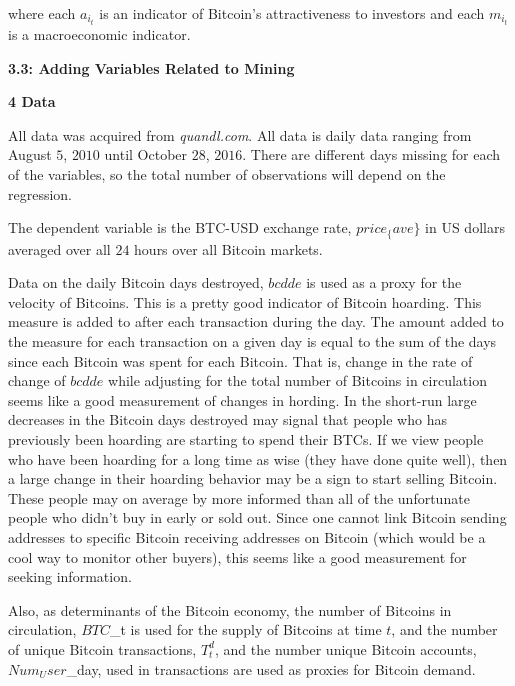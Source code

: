 \documentclass{article}[10 pt]
\newcommand{\vs}{\vspace{0.1in}}
\begin{document}
\vs

where each $a_{i_t}$ is an indicator of Bitcoin's attractiveness to
investors and each $m_{i_t}$ is a macroeconomic indicator.

\vs 

\textbf{3.3: Adding Variables Related to Mining}

\vs



\vs

\textbf{4 Data}

\vs

All data was acquired from \textit{quandl.com}. All data is daily data
ranging from August $5$, $2010$ until October $28$, $2016$. There are
different days missing for each of the variables, so the total number of
observations will depend on the regression. 

\vs

The dependent variable is the
BTC-USD exchange rate, $price_\{ave\}$ in US dollars averaged over all $24$
hours over all Bitcoin markets. 

\vs

Data on the daily Bitcoin days destroyed,
$bcdde$ is used as a proxy for the velocity of Bitcoins. This is a pretty
good indicator of Bitcoin hoarding. This measure is added to after each
transaction during the day. The amount added to the measure for each
transaction on a given day is equal to the sum of the days since each
Bitcoin was spent for each Bitcoin. That is, change in the rate of change of
$bcdde$ while adjusting for the total number of Bitcoins in circulation
seems like a good measurement of changes in hording. In the short-run large
decreases in the Bitcoin days destroyed may signal that people who has
previously been hoarding are starting to spend their BTCs. If we view people
who have been hoarding for a long time as wise (they have done quite well), 
then a large change in their hoarding behavior may be a sign to start
selling Bitcoin. These people may on average by more informed than all of
the unfortunate people who didn't buy in early or sold out. Since one cannot
link Bitcoin sending addresses to specific Bitcoin receiving addresses on
Bitcoin (which would be a cool way to monitor other buyers), this seems
like a good measurement for seeking information.

\vs

Also, as determinants of the Bitcoin economy, the number of Bitcoins in 
circulation, $BTC$_t is used for the supply of Bitcoins at time $t$, 
and the number of unique Bitcoin transactions, $T^d_t$, and the number 
unique Bitcoin accounts, $Num_User$_{day}, used in transactions are used as 
proxies for Bitcoin demand. 
\end{document}
